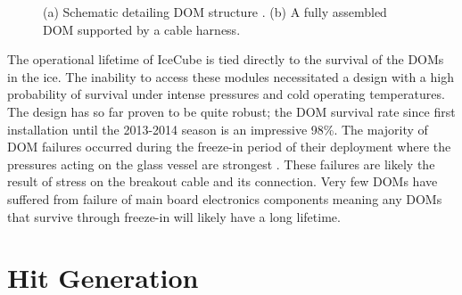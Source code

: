 \documentclass{gatech-thesis}
\begin{document}
\begin{figure}
\centering
{}
\caption[DOM Schematic and Photo]{(a) Schematic detailing DOM structure \cite{2009NIMPA.601..294A}. (b) A fully assembled DOM supported by a cable harness.} 
\label{fig:DomPics}
\end{figure}
The operational lifetime of IceCube is tied directly to the survival of the DOMs in the ice. The inability to access these modules necessitated a design with a high probability of survival under intense pressures and cold operating temperatures. The design has so far proven to be quite robust; the DOM survival rate since first installation until the 2013-2014 season is an impressive 98\%. The majority of DOM failures occurred during the freeze-in period of their deployment where the pressures acting on the glass vessel are strongest \cite{2009NIMPA.601..294A}. These failures are likely the result of stress on the breakout cable and its connection. Very few DOMs have suffered from failure of main board electronics components meaning any DOMs that survive through freeze-in will likely have a long lifetime.

\section{Hit Generation}
\end{document}
